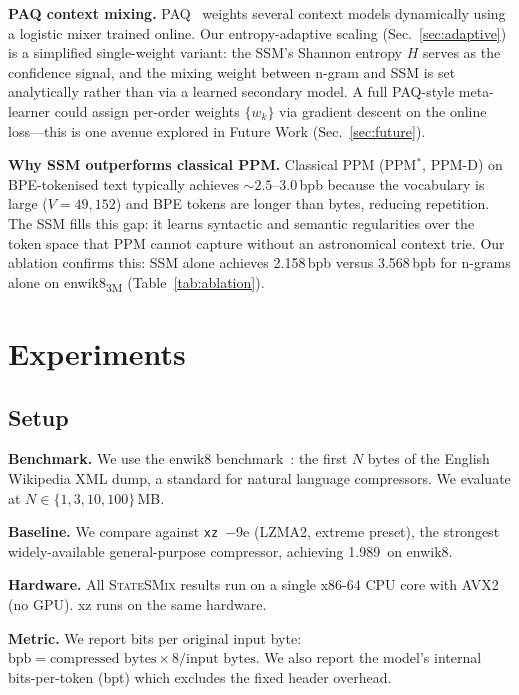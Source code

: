 \documentclass[10pt,twocolumn]{article}
\newcommand{\ssmcomp}{\textsc{StateSMix}}
\newcommand{\bpb}{\text{bpb}}
\begin{document}
\textbf{PAQ context mixing.}
PAQ~\citep{mahoney2005} weights several context models dynamically
using a logistic mixer trained online.  Our entropy-adaptive scaling
(Sec.~\ref{sec:adaptive}) is a simplified single-weight variant: the
SSM's Shannon entropy $H$ serves as the confidence signal, and the
mixing weight between n-gram and SSM is set analytically rather than
via a learned secondary model.  A full PAQ-style meta-learner could
assign per-order weights $\{w_k\}$ via gradient descent on the
online loss---this is one avenue explored in Future Work
(Sec.~\ref{sec:future}).

\textbf{Why SSM outperforms classical PPM.}
Classical PPM (PPM$^*$, PPM-D) on BPE-tokenised text typically achieves
${\sim}2.5$--$3.0$\,bpb because the vocabulary is large ($V{=}49{,}152$)
and BPE tokens are longer than bytes, reducing repetition.  The SSM
fills this gap: it learns syntactic and semantic regularities over the
token space that PPM cannot capture without an astronomical context
trie.  Our ablation confirms this: SSM alone achieves 2.158\,bpb versus
3.568\,bpb for n-grams alone on enwik8\textsubscript{3M}
(Table~\ref{tab:ablation}).

\section{Experiments}
\label{sec:experiments}

\subsection{Setup}

\textbf{Benchmark.}  We use the enwik8 benchmark~\citep{enwik8}: the
first $N$ bytes of the English Wikipedia XML dump, a standard for
natural language compressors.  We evaluate at $N\in\{1,3,10,100\}$\,MB.

\textbf{Baseline.}  We compare against \texttt{xz}~$-$9e (LZMA2,
extreme preset), the strongest widely-available general-purpose
compressor, achieving 1.989\,\bpb{} on enwik8.

\textbf{Hardware.}  All \ssmcomp{} results run on a single x86-64
CPU core with AVX2 (no GPU).  xz runs on the same hardware.

\textbf{Metric.}  We report bits per original input byte:
$\bpb = \text{compressed bytes} \times 8 / \text{input bytes}$.
We also report the model's internal bits-per-token (bpt) which excludes
the fixed header overhead.
\end{document}
